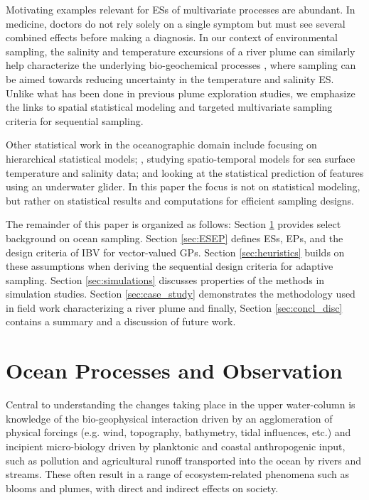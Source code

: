 \documentclass[aoas]{imsart}
\begin{document}
Motivating examples relevant for ESs of multivariate processes are
abundant. In medicine, doctors do not rely solely on a single symptom
but must see several combined effects before making a diagnosis. In
our context of environmental sampling, the salinity and temperature
excursions of a river plume can similarly help characterize the
underlying bio-geochemical processes
\citep{hopkins2013detection,Pinto2018}, where sampling can be aimed
towards reducing uncertainty in the temperature and salinity ES.
Unlike what has been done in previous plume exploration studies, we
emphasize the links to spatial statistical modeling and targeted
multivariate sampling criteria for sequential sampling.

Other statistical
work in the oceanographic domain include \cite{wikle2013modern}
focusing on hierarchical statistical models; \cite{sahu2008space},
studying spatio-temporal models for sea surface temperature and
salinity data; and \cite{mellucci2018oceanic} looking at the
statistical prediction of features using an underwater glider.
In this paper the focus is not on statistical modeling, but rather on statistical results and computations for efficient sampling designs. 

The remainder of this paper is organized as follows: Section
\ref{sec:bg} provides select background on ocean sampling. Section
\ref{sec:ESEP} defines ESs, EPs, and the design criteria of IBV for
vector-valued GPs. Section \ref{sec:heuristics} builds on these
assumptions when deriving the sequential design criteria for adaptive
sampling. Section \ref{sec:simulations} discusses properties of the
methods in simulation studies. Section \ref{sec:case_study}
demonstrates the methodology used in field work characterizing a river
plume and finally, Section \ref{sec:concl_disc} contains a summary and
a discussion of future work.

\section{Ocean Processes and Observation}
\label{sec:bg}

Central to understanding the changes taking place in the upper
water-column is knowledge of the bio-geophysical interaction driven by
an agglomeration of physical forcings (e.g. wind, topography,
bathymetry, tidal influences, etc.) and incipient micro-biology driven
by planktonic and coastal anthropogenic input, such as pollution and
agricultural runoff transported into the ocean by rivers and streams.
These often result in a range of ecosystem-related phenomena such as
blooms and plumes, with direct and indirect effects on society. 
\end{document}
